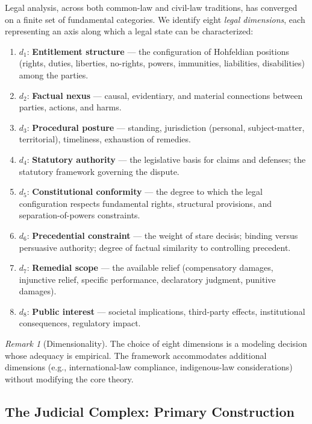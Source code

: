 \documentclass[12pt]{article}
\theoremstyle{definition}
\theoremstyle{remark}
\newtheorem{remark}[theorem]{Remark}
\begin{document}
Legal analysis, across both common-law and civil-law traditions, has converged on a finite set of fundamental categories.  We identify eight \emph{legal dimensions}, each representing an axis along which a legal state can be characterized:

\begin{enumerate}
    \item $d_1$: \textbf{Entitlement structure} --- the configuration of Hohfeldian positions (rights, duties, liberties, no-rights, powers, immunities, liabilities, disabilities) among the parties.
    \item $d_2$: \textbf{Factual nexus} --- causal, evidentiary, and material connections between parties, actions, and harms.
    \item $d_3$: \textbf{Procedural posture} --- standing, jurisdiction (personal, subject-matter, territorial), timeliness, exhaustion of remedies.
    \item $d_4$: \textbf{Statutory authority} --- the legislative basis for claims and defenses; the statutory framework governing the dispute.
    \item $d_5$: \textbf{Constitutional conformity} --- the degree to which the legal configuration respects fundamental rights, structural provisions, and separation-of-powers constraints.
    \item $d_6$: \textbf{Precedential constraint} --- the weight of stare decisis; binding versus persuasive authority; degree of factual similarity to controlling precedent.
    \item $d_7$: \textbf{Remedial scope} --- the available relief (compensatory damages, injunctive relief, specific performance, declaratory judgment, punitive damages).
    \item $d_8$: \textbf{Public interest} --- societal implications, third-party effects, institutional consequences, regulatory impact.
\end{enumerate}

\begin{remark}[Dimensionality]
The choice of eight dimensions is a modeling decision whose adequacy is empirical.  The framework accommodates additional dimensions (e.g., international-law compliance, indigenous-law considerations) without modifying the core theory.
\end{remark}

\subsection{The Judicial Complex: Primary Construction}
\end{document}
